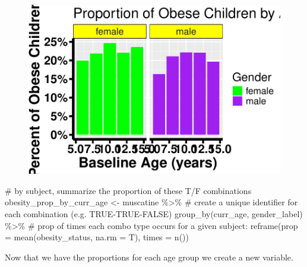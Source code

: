 \documentclass[
  letterpaper,
  DIV=11,
  numbers=noendperiod]{scrreprt}
\newenvironment{Shaded}{\begin{snugshade}}{\end{snugshade}}
\newcommand{\AttributeTok}[1]{\textcolor[rgb]{0.40,0.45,0.13}{#1}}
\newcommand{\CommentTok}[1]{\textcolor[rgb]{0.37,0.37,0.37}{#1}}
\newcommand{\FunctionTok}[1]{\textcolor[rgb]{0.28,0.35,0.67}{#1}}
\newcommand{\NormalTok}[1]{\textcolor[rgb]{0.00,0.23,0.31}{#1}}
\newcommand{\OtherTok}[1]{\textcolor[rgb]{0.00,0.23,0.31}{#1}}
\newcommand{\SpecialCharTok}[1]{\textcolor[rgb]{0.37,0.37,0.37}{#1}}
\begin{document}
\begin{figure}[H]

{\centering \includegraphics{Longi_noncontinuous_files/figure-pdf/unnamed-chunk-9-1.pdf}

}

\end{figure}

\begin{Shaded}
\begin{Highlighting}[]
\CommentTok{\# by subject, summarize the proportion of these T/F combinations}
\NormalTok{obesity\_prop\_by\_curr\_age }\OtherTok{\textless{}{-}}\NormalTok{ muscatine }\SpecialCharTok{\%\textgreater{}\%}
    \CommentTok{\# create a unique identifier for each combination (e.g. \textquotesingle{}TRUE{-}TRUE{-}FALSE\textquotesingle{})}
\FunctionTok{group\_by}\NormalTok{(curr\_age, gender\_label) }\SpecialCharTok{\%\textgreater{}\%}
    \CommentTok{\# prop of times each combo type occurs for a given subject:}
\FunctionTok{reframe}\NormalTok{(}\AttributeTok{prop =} \FunctionTok{mean}\NormalTok{(obesity\_status, }\AttributeTok{na.rm =}\NormalTok{ T), }\AttributeTok{times =} \FunctionTok{n}\NormalTok{())}
\end{Highlighting}
\end{Shaded}

Now that we have the proportions for each age group we create a new
variable.
\end{document}
